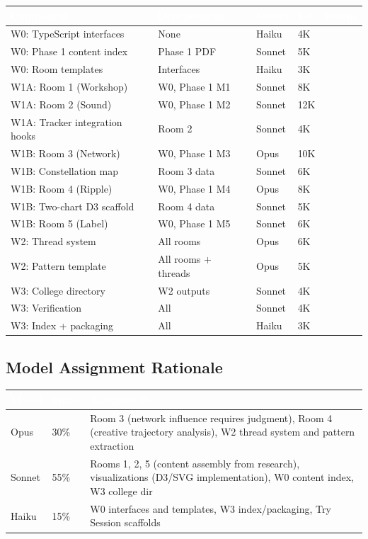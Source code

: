 \documentclass[11pt,letterpaper]{article}
\newcommand{\tableheader}[1]{\textbf{\sffamily\textcolor{white}{#1}}}
\begin{document}
\begin{center}
\begin{tabularx}{\textwidth}{L{3.5cm}L{2.5cm}C{1.8cm}C{1.8cm}}
\toprule
{}
\tableheader{Component} & \tableheader{Dependencies} & \tableheader{Model} & \tableheader{Est.\ Tokens} \\
\midrule
W0: TypeScript interfaces & None & Haiku & 4K \\
W0: Phase 1 content index & Phase 1 PDF & Sonnet & 5K \\
W0: Room templates & Interfaces & Haiku & 3K \\
W1A: Room 1 (Workshop) & W0, Phase 1 M1 & Sonnet & 8K \\
W1A: Room 2 (Sound) & W0, Phase 1 M2 & Sonnet & 12K \\
W1A: Tracker integration hooks & Room 2 & Sonnet & 4K \\
W1B: Room 3 (Network) & W0, Phase 1 M3 & Opus & 10K \\
W1B: Constellation map & Room 3 data & Sonnet & 6K \\
W1B: Room 4 (Ripple) & W0, Phase 1 M4 & Opus & 8K \\
W1B: Two-chart D3 scaffold & Room 4 data & Sonnet & 5K \\
W1B: Room 5 (Label) & W0, Phase 1 M5 & Sonnet & 6K \\
W2: Thread system & All rooms & Opus & 6K \\
W2: Pattern template & All rooms + threads & Opus & 5K \\
W3: College directory & W2 outputs & Sonnet & 4K \\
W3: Verification & All & Sonnet & 4K \\
W3: Index + packaging & All & Haiku & 3K \\
\bottomrule
\end{tabularx}
\end{center}

\subsection{Model Assignment Rationale}

\begin{center}
\begin{tabularx}{\textwidth}{C{1.5cm}C{1.5cm}X}
\toprule
{}
\tableheader{Model} & \tableheader{Share} & \tableheader{Assigned To} \\
\midrule
Opus & 30\% & Room 3 (network influence requires judgment), Room 4 (creative trajectory analysis), W2 thread system and pattern extraction \\
Sonnet & 55\% & Rooms 1, 2, 5 (content assembly from research), visualizations (D3/SVG implementation), W0 content index, W3 college dir \\
Haiku & 15\% & W0 interfaces and templates, W3 index/packaging, Try Session scaffolds \\
\bottomrule
\end{tabularx}
\end{center}
\end{document}
